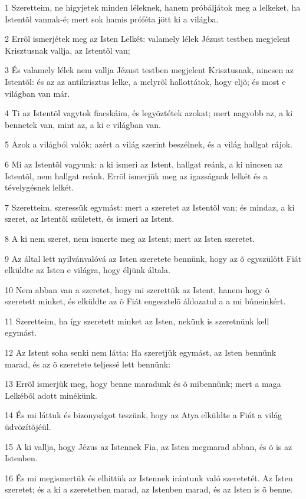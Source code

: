 \par 1 Szeretteim, ne higyjetek minden léleknek, hanem próbáljátok meg a lelkeket, ha Istentõl vannak-é; mert sok hamis próféta jött ki a világba.
\par 2 Errõl ismerjétek meg az Isten Lelkét: valamely lélek Jézust testben megjelent Krisztusnak vallja, az Istentõl van;
\par 3 És valamely lélek nem vallja Jézust testben megjelent Krisztusnak, nincsen az Istentõl: és az az antikrisztus lelke, a melyrõl hallottátok, hogy eljõ; és most e világban van már.
\par 4 Ti az Istentõl vagytok fiacskáim, és legyõztétek azokat; mert nagyobb az, a ki bennetek van, mint az, a ki e világban van.
\par 5 Azok a világból valók; azért a világ szerint beszélnek, és a világ hallgat rájok.
\par 6 Mi az Istentõl vagyunk: a ki ismeri az Istent, hallgat reánk, a ki nincsen az Istentõl, nem hallgat reánk. Errõl ismerjük meg az igazságnak lelkét és a tévelygésnek lelkét.
\par 7 Szeretteim, szeressük egymást: mert a szeretet az Istentõl van; és mindaz, a ki szeret, az Istentõl született, és ismeri az Istent.
\par 8 A ki nem szeret, nem ismerte meg az Istent; mert az Isten  szeretet.
\par 9 Az által lett nyilvánvalóvá az Isten szeretete bennünk, hogy az õ egyszülött Fiát elküldte az Isten e világra, hogy éljünk általa.
\par 10 Nem abban van a szeretet, hogy mi szerettük az Istent, hanem hogy õ szeretett minket, és elküldte az õ Fiát engesztelõ áldozatul a a mi bûneinkért.
\par 11 Szeretteim, ha így szeretett minket az Isten, nekünk is szeretnünk kell egymást.
\par 12 Az Istent soha senki nem látta: Ha szeretjük egymást, az Isten bennünk marad, és az õ szeretete  teljessé lett bennünk:
\par 13 Errõl ismerjük meg, hogy benne maradunk és õ mibennünk; mert a maga Lelkébõl adott minékünk.
\par 14 És mi láttuk és bizonyságot teszünk, hogy az Atya elküldte a Fiút a világ üdvözítõjéül.
\par 15 A ki vallja, hogy Jézus az Istennek Fia, az Isten megmarad abban, és õ is az Istenben.
\par 16 És mi megismertük és elhittük az Istennek irántunk való szeretetét. Az Isten szeretet; és a ki a szeretetben marad, az Istenben marad, és az Isten is õ benne.
